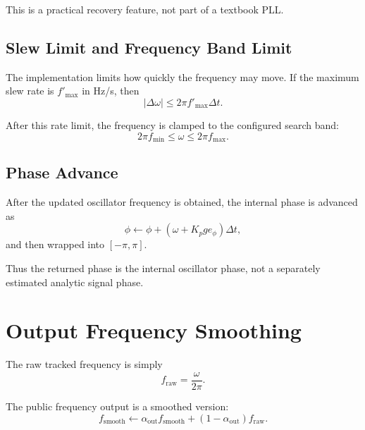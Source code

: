 \documentclass[conference]{IEEEtran}
\begin{document}
    This is a practical recovery feature, not part of a textbook PLL.

    \subsection{Slew Limit and Frequency Band Limit}

    The implementation limits how quickly the frequency may move. If the maximum
    slew rate is \(f'_{\max}\) in \si{Hz/s}, then
    \begin{equation}
        |\Delta\omega| \le 2\pi f'_{\max}\Delta t.
    \end{equation}

    After this rate limit, the frequency is clamped to the configured search band:
    \begin{equation}
        2\pi f_{\min} \le \omega \le 2\pi f_{\max}.
    \end{equation}

    \subsection{Phase Advance}

    After the updated oscillator frequency is obtained, the internal phase is
    advanced as
    \begin{equation}
        \phi \leftarrow \phi + (\omega + K_p g e_\phi)\Delta t,
    \end{equation}
    and then wrapped into \([-\pi,\pi]\).

    Thus the returned phase is the internal oscillator phase, not a separately
    estimated analytic signal phase.

    \section{Output Frequency Smoothing}

    The raw tracked frequency is simply
    \begin{equation}
        f_{\mathrm{raw}} = \frac{\omega}{2\pi}.
    \end{equation}

    The public frequency output is a smoothed version:
    \begin{equation}
        f_{\mathrm{smooth}}
        \leftarrow
        \alpha_{\mathrm{out}} f_{\mathrm{smooth}}
        +
        (1-\alpha_{\mathrm{out}}) f_{\mathrm{raw}}.
    \end{equation}
\end{document}

